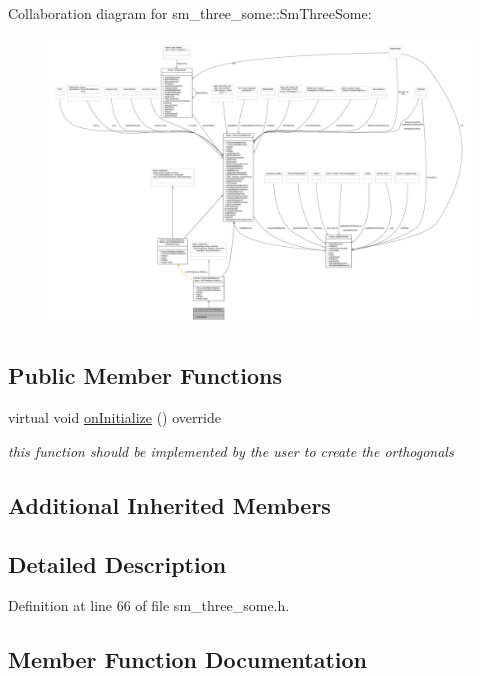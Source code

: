Collaboration diagram for sm\+\_\+three\+\_\+some\+:\+:Sm\+Three\+Some\+:\nopagebreak
\begin{figure}[H]
\begin{center}
\leavevmode
\includegraphics[width=350pt]{structsm__three__some_1_1SmThreeSome__coll__graph}
\end{center}
\end{figure}
\subsection*{Public Member Functions}
\begin{DoxyCompactItemize}
\item 
virtual void \hyperlink{structsm__three__some_1_1SmThreeSome_ac811ac731023ccbab1db358d0efa1c0e}{on\+Initialize} () override
\begin{DoxyCompactList}\small\item\em this function should be implemented by the user to create the orthogonals \end{DoxyCompactList}\end{DoxyCompactItemize}
\subsection*{Additional Inherited Members}


\subsection{Detailed Description}


Definition at line 66 of file sm\+\_\+three\+\_\+some.\+h.



\subsection{Member Function Documentation}
